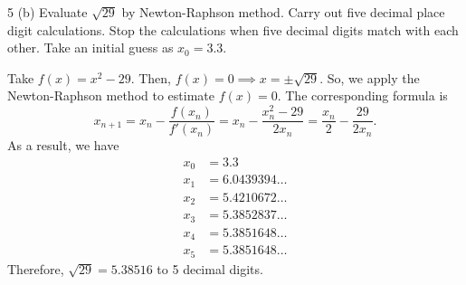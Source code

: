 \documentclass[11pt]{penrose}
\begin{document}
\begin{problem}{5 (b)}
    Evaluate $\sqrt{29}$ by Newton-Raphson method. Carry out five decimal place digit calculations. Stop the calculations when five decimal digits match with each other. Take an initial guess as $x_0 = 3.3$.

    \solution Take $f(x) = x^2 - 29$. Then, $f(x) = 0 \implies x = \pm \sqrt{29}$. So, we apply the Newton-Raphson method to estimate $f(x) = 0$. The corresponding formula is
    \begin{equation*}
        x_{n+1} = x_{n} - \frac{f(x_n)}{f'(x_n)} = x_{n} - \frac{x_n^2 - 29}{2 x_n} = \frac{x_n}{2} - \frac{29}{2 x_n}.
    \end{equation*}
    As a result, we have
    \begin{align*}
        x_0 &= 3.3\\
        x_1 &= 6.0439394\dots\\
        x_2 &= 5.4210672\dots\\
        x_3 &= 5.3852837\dots\\
        x_4 &= 5.3851648\dots\\
        x_5 &= 5.3851648\dots
    \end{align*}
    Therefore, $\sqrt{29} = 5.38516$ to 5 decimal digits.
\end{problem}
\end{document}
